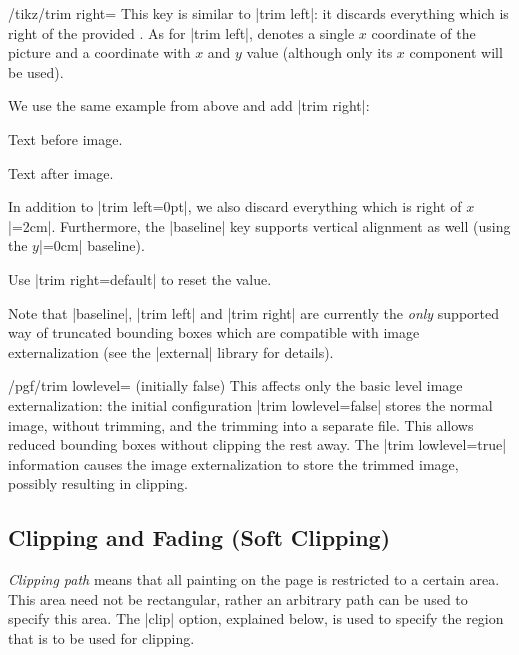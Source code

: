 \begin{key}{/tikz/trim right=}
    This key is similar to |trim left|: it discards everything which is right
    of the provided . As for |trim left|,
     denotes a single $x$ coordinate of the picture and
     a coordinate with $x$ and $y$ value (although only its
    $x$ component will be used).

    We use the same example from above and add |trim right|:
\begin{codeexample}[]
Text before image.%
Text after image.
\end{codeexample}
    In addition to |trim left=0pt|, we also discard everything which is right
    of $x$|=2cm|. Furthermore, the |baseline| key supports vertical alignment
    as well (using the $y$|=0cm| baseline).

    Use |trim right=default| to reset the value.
\end{key}

Note that |baseline|, |trim left| and |trim right| are currently the
\emph{only} supported way of truncated bounding boxes which are compatible with
image externalization (see the |external| library for details).

\begin{key}{/pgf/trim lowlevel= (initially false)}
    This affects only the basic level image externalization: the initial
    configuration |trim lowlevel=false| stores the normal image, without
    trimming, and the trimming into a separate file. This allows reduced
    bounding boxes without clipping the rest away. The |trim lowlevel=true|
    information causes the image externalization to store the trimmed image,
    possibly resulting in clipping.
\end{key}


\subsection{Clipping and Fading (Soft Clipping)}

\emph{Clipping path} means that all painting on the page is restricted to a
certain area. This area need not be rectangular, rather an arbitrary path can
be used to specify this area. The |clip| option, explained below, is used to
specify the region that is to be used for clipping.


